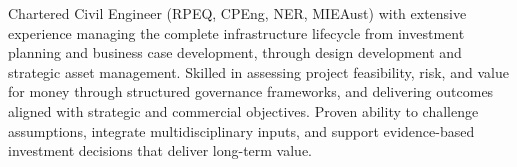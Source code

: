 %
%
%


\par{Chartered Civil Engineer (RPEQ, CPEng, NER, MIEAust) with extensive experience managing the complete infrastructure lifecycle from investment planning and business case development, through design development and strategic asset management. Skilled in assessing project feasibility, risk, and value for money through structured governance frameworks, and delivering outcomes aligned with strategic and commercial objectives. Proven ability to challenge assumptions, integrate multidisciplinary inputs, and support evidence-based investment decisions that deliver long-term value.}



